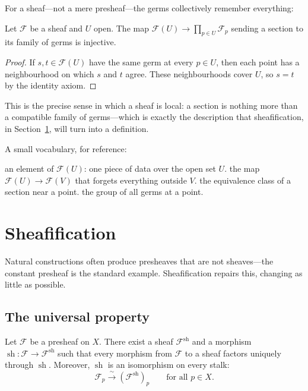 For a sheaf---not a mere presheaf---the germs collectively remember
everything:

\begin{proposition}
  \label{prop:germs-determine}
  Let $\mathcal{F}$ be a sheaf and $U$ open. The map
  $\mathcal{F}(U) \to \prod_{p \in U} \mathcal{F}_p$ sending a section
  to its family of germs is injective.
\end{proposition}

\begin{proof}
  If $s, t \in \mathcal{F}(U)$ have the same germ at every $p \in U$,
  then each point has a neighbourhood on which $s$ and $t$ agree. These
  neighbourhoods cover $U$, so $s = t$ by the identity axiom.
\end{proof}

This is the precise sense in which a sheaf is local: a section is
nothing more than a compatible family of germs---which is exactly the
description that sheafification, in
Section~\ref{sec:sheafification}, will turn into a definition.

A small vocabulary, for reference:
\begin{auDescription}[5.5em]
   an element of $\mathcal{F}(U)$: one piece of data over
        the open set $U$.
   the map $\mathcal{F}(U) \to \mathcal{F}(V)$ that
        forgets everything outside $V$.
   the equivalence class of a section near a point.
   the group of all germs at a point.
\end{auDescription}

\section{Sheafification}
\label{sec:sheafification}

Natural constructions often produce presheaves that are not
sheaves---the constant presheaf is the standard example.
Sheafification repairs this, changing as little as possible.

\subsection{The universal property}
\label{sec:univ}

\begin{theorem}[Sheafification]
  \label{thm:sheafification}
  Let $\mathcal{F}$ be a presheaf on $X$. There exist a sheaf
  $\mathcal{F}^{\mathrm{sh}}$ and a morphism
  $\operatorname{sh} \colon \mathcal{F} \to \mathcal{F}^{\mathrm{sh}}$
  such that every morphism from $\mathcal{F}$ to a sheaf factors
  uniquely through $\operatorname{sh}$. Moreover, $\operatorname{sh}$
  is an isomorphism on every stalk:
  \begin{equation}
    \label{eq:stalkiso}
    \mathcal{F}_p \xrightarrow{\;\sim\;} (\mathcal{F}^{\mathrm{sh}})_p
    \qquad\text{for all } p \in X.
  \end{equation}
\end{theorem}

